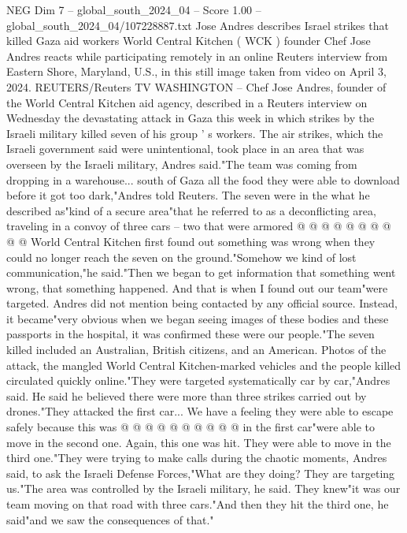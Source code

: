 \begin{textsample}{NEG Dim 7 – global\_south\_2024\_04 – Score 1.00 – global\_south\_2024\_04/107228887.txt}  \label{ex:f7_neg_288}
Jose Andres describes Israel strikes that killed Gaza aid workers World Central Kitchen ( WCK ) founder Chef Jose Andres reacts while participating remotely in an online Reuters interview from Eastern Shore, Maryland, U.S., in this still image taken from video on April 3, 2024.
REUTERS/Reuters TV WASHINGTON -- Chef Jose Andres, founder of the World Central Kitchen aid agency, described in a Reuters interview on Wednesday the devastating attack in Gaza this week in which strikes by the Israeli military killed seven of his group ' s workers.
The air strikes, which the Israeli government said were unintentional, took place in an area that was overseen by the Israeli military, Andres said."The team was coming from dropping in a warehouse... south of Gaza all the food they were able to download before it got too dark,"Andres told Reuters.
The seven were in the what he described as"kind of a secure area"that he referred to as a deconflicting area, traveling in a convoy of three cars -- two that were armored @ @ @ @ @ @ @ @ @ @ World Central Kitchen first found out something was wrong when they could no longer reach the seven on the ground."Somehow we kind of lost communication,"he said."Then we began to get information that something went wrong, that something happened.
And that is when I found out our team"were targeted.
Andres did not mention being contacted by any official source.
Instead, it became"very obvious when we began seeing images of these bodies and these passports in the hospital, it was confirmed these were our people."The seven killed included an Australian, British citizens, and an American.
Photos of the attack, the mangled World Central Kitchen-marked vehicles and the people killed circulated quickly online."They were targeted systematically car by car,"Andres said.
He said he believed there were more than three strikes carried out by drones."They attacked the first car...
We have a feeling they were able to escape safely because this was @ @ @ @ @ @ @ @ @ @ in the first car"were able to move in the second one.
Again, this one was hit.
They were able to move in the third one."They were trying to make calls during the chaotic moments, Andres said, to ask the Israeli Defense Forces,"What are they doing?
They are targeting us."The area was controlled by the Israeli military, he said.
They knew"it was our team moving on that road with three cars."And then they hit the third one, he said"and we saw the consequences of that."

\end{textsample}
